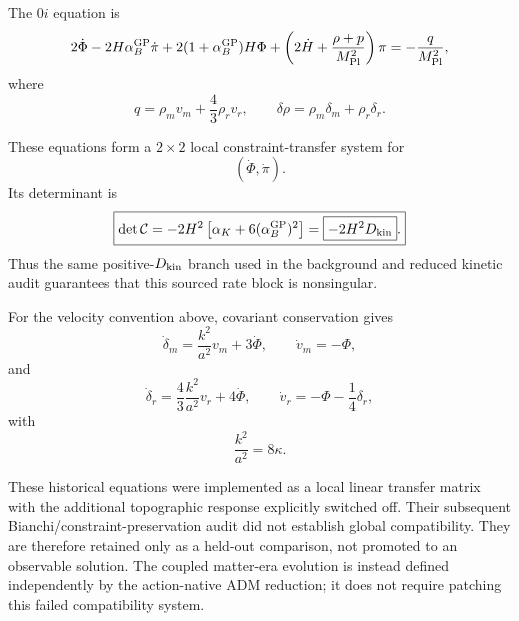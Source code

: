 The \(0i\) equation is
\[
2\dot\Phi
-
2H\alpha_B^{\rm GP}\dot\pi
+
2(1+\alpha_B^{\rm GP})H\Phi
+
\left(
2\dot H+\frac{\rho+p}{M_{\rm Pl}^2}
\right)\pi
=
-\frac{q}{M_{\rm Pl}^2},
\]
where
\[
q
=
\rho_m v_m
+
\frac43\rho_r v_r,
\qquad
\delta\rho
=
\rho_m\delta_m+\rho_r\delta_r.
\]

These equations form a \(2\times2\) local constraint-transfer system for
\[
(\dot\Phi,\dot\pi).
\]
Its determinant is
\[
\boxed{
\det\mathcal C
=
-2H^2
\left[
\alpha_K+6(\alpha_B^{\rm GP})^2
\right]
=
\boxed{-2H^2D_{\rm kin}}.
}
\]
Thus the same positive-\(D_{\rm kin}\) branch used in the background and reduced kinetic audit guarantees that this sourced rate block is nonsingular.

For the velocity convention above, covariant conservation gives
\[
\dot\delta_m
=
\frac{k^2}{a^2}v_m
+
3\dot\Phi,
\qquad
\dot v_m=-\Phi,
\]
and
\[
\dot\delta_r
=
\frac43\frac{k^2}{a^2}v_r
+
4\dot\Phi,
\qquad
\dot v_r
=
-\Phi-\frac14\delta_r,
\]
with
\[
\frac{k^2}{a^2}=8\kappa.
\]

These historical equations were implemented as a local linear transfer matrix with the additional topographic response explicitly switched off. Their subsequent Bianchi/constraint-preservation audit did not establish global compatibility. They are therefore retained only as a held-out comparison, not promoted to an observable solution. The coupled matter-era evolution is instead defined independently by the action-native ADM reduction; it does not require patching this failed compatibility system.
